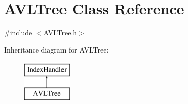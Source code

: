 \hypertarget{class_a_v_l_tree}{}\section{A\+V\+L\+Tree Class Reference}
\label{class_a_v_l_tree}


{\ttfamily \#include $<$A\+V\+L\+Tree.\+h$>$}

Inheritance diagram for A\+V\+L\+Tree\+:\begin{figure}[H]
\begin{center}
\leavevmode
\includegraphics[height=2.000000cm]{class_a_v_l_tree}
\end{center}
\end{figure}
